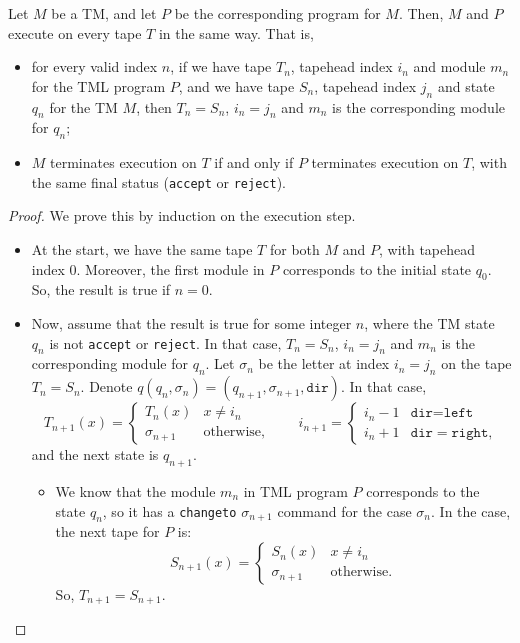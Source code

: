 \begin{appendices}
\begin{theorem} \label{thm:TM_to_TMP}
    Let $M$ be a TM, and let $P$ be the corresponding program for $M$. Then, $M$ and $P$ execute on every tape $T$ in the same way. That is, 
    \begin{itemize}
        \item for every valid index $n$, if we have tape $T_n$, tapehead index $i_n$ and module $m_n$ for the TML program $P$, and we have tape $S_n$, tapehead index $j_n$ and state $q_n$ for the TM $M$, then $T_n = S_n$, $i_n = j_n$ and $m_n$ is the corresponding module for $q_n$;
        \item $M$ terminates execution on $T$ if and only if $P$ terminates execution on $T$, with the same final status (\texttt{accept} or \texttt{reject}).
    \end{itemize}
\end{theorem}
\begin{proof}
    We prove this by induction on the execution step. 
    \begin{itemize}
        \item At the start, we have the same tape $T$ for both $M$ and $P$, with tapehead index $0$. Moreover, the first module in $P$ corresponds to the initial state $q_0$. So, the result is true if $n = 0$.
        
        \item Now, assume that the result is true for some integer $n$, where the TM state $q_n$ is not \texttt{accept} or \texttt{reject}. In that case, $T_n = S_n$, $i_n = j_n$ and $m_n$ is the corresponding module for $q_n$. Let $\sigma_n$ be the letter at index $i_n = j_n$ on the tape $T_n = S_n$. Denote $q(q_n, \sigma_n) = (q_{n+1}, \sigma_{n+1}, \texttt{dir})$. In that case,
        \[T_{n+1}(x) = \begin{cases}
            T_n(x) & x \neq i_n \\
            \sigma_{n+1} & \text{otherwise},
        \end{cases} \qquad i_{n+1} = \begin{cases}
            i_n - 1 & \texttt{dir} = \texttt{left} \\
            i_n + 1 & \texttt{dir} = \texttt{right},
        \end{cases}\]
        and the next state is $q_{n+1}$. 
        
        \begin{itemize}
            \item We know that the module $m_n$ in TML program $P$ corresponds to the state $q_n$, so it has a \texttt{changeto} $\sigma_{n+1}$ command for the case $\sigma_n$. In the case, the next tape for $P$ is:
            \[S_{n+1}(x) = \begin{cases}
                S_n(x) & x \neq i_n \\
                \sigma_{n+1} & \text{otherwise}.
            \end{cases}\]
            So, $T_{n+1} = S_{n+1}$. 
            

\end{itemize}
\end{itemize}
\end{proof}
\end{appendices}
